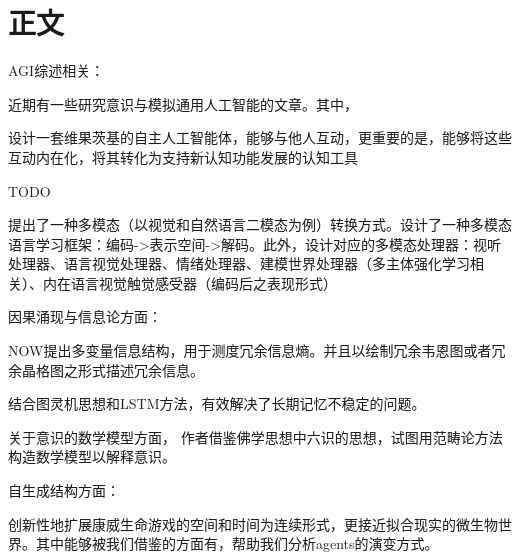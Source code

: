 \documentclass[12pt]{ctexart}
\newcounter{lastnote}
\begin{document}
\section*{正文}

AGI综述相关：

近期有一些研究意识与模拟通用人工智能的文章。其中，

\citep{Reser_2022}设计一套维果茨基的自主人工智能体，能够与他人互动，更重要的是，能够将这些互动内在化，将其转化为支持新认知功能发展的认知工具

TODO\citep{Colas.Karch.ea_2022}

\citep{Liang_2022}提出了一种多模态（以视觉和自然语言二模态为例）转换方式。设计了一种多模态语言学习框架：编码->表示空间->解码。此外，设计对应的多模态处理器：视听处理器、语言视觉处理器、情绪处理器、建模世界处理器（多主体强化学习相关）、内在语言视觉触觉感受器（编码后之表现形式）


因果涌现与信息论方面：

NOW\citep{williams2010nonnegative}提出多变量信息结构，用于测度冗余信息熵。并且以绘制冗余韦恩图或者冗余晶格图之形式描述冗余信息。

\citep{Graves.Wayne.ea_2014_NeuralTuringMachines}结合图灵机思想和LSTM方法，有效解决了长期记忆不稳定的问题。


关于意识的数学模型方面，\citep{Signorelli.Wang.ea_2021_CompositionalModelConsciousnessBasedConsciousnessOnly} \citep{Signorelli.Wang.ea_2021_Reasoningconsciousexperienceaxiomaticgraphicalmathematics}作者借鉴佛学思想中六识的思想，试图用范畴论方法构造数学模型以解释意识。


自生成结构方面：

\citep{Chan_2020_LeniaExpandedUniverse}创新性地扩展康威生命游戏的空间和时间为连续形式，更接近拟合现实的微生物世界。其中能够被我们借鉴的方面有，帮助我们分析agents的演变方式。




% 




\end{document}
